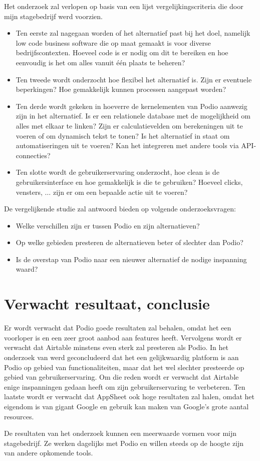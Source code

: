 Het onderzoek zal verlopen op basis van een lijst vergelijkingscriteria die door mijn stagebedrijf werd voorzien. 

\begin{itemize}
    \item Ten eerste zal nagegaan worden of het alternatief past bij het doel, namelijk low code business software die op maat gemaakt is voor diverse bedrijfscontexten. Hoeveel code is er nodig om dit te bereiken en hoe eenvoudig is het om alles vanuit één plaats te beheren?
    \item Ten tweede wordt onderzocht hoe flexibel het alternatief is. Zijn er eventuele beperkingen? Hoe gemakkelijk kunnen processen aangepast worden?
    \item Ten derde wordt gekeken in hoeverre de kernelementen van Podio aanwezig zijn in het alternatief. Is er een relationele database met de mogelijkheid om alles met elkaar te linken?  Zijn er calculatievelden om berekeningen uit te voeren of om dynamisch tekst te tonen? Is het alternatief in staat om automatiseringen uit te voeren? Kan het integreren met andere tools via API-connecties?
    \item Ten slotte wordt de gebruikerservaring onderzocht, hoe clean is de gebruikersinterface en hoe gemakkelijk is die te gebruiken? Hoeveel clicks, vensters, $\ldots$ zijn er om een bepaalde actie uit te voeren?
\end{itemize}

De vergelijkende studie zal antwoord bieden op volgende onderzoeksvragen:

\begin{itemize}
    \item Welke verschillen zijn er tussen Podio en zijn alternatieven?
    \item Op welke gebieden presteren de alternatieven beter of slechter dan Podio?
    \item Is de overstap van Podio naar een nieuwer alternatief de nodige inspanning waard?
\end{itemize}

\section{Verwacht resultaat, conclusie}%
\label{sec:verwachte_resultaten}

Er wordt verwacht dat Podio goede resultaten zal behalen, omdat het een voorloper is en een zeer groot aanbod aan features heeft. Vervolgens wordt er verwacht dat Airtable minstens even sterk zal presteren als Podio. In het onderzoek van \textcite{Spitaels2022} werd geconcludeerd dat het een gelijkwaardig platform is aan Podio op gebied van functionaliteiten, maar dat het wel slechter presteerde op gebied van gebruikerservaring. Om die reden wordt er verwacht dat Airtable enige inspanningen gedaan heeft om zijn gebruikerservaring te verbeteren. Ten laatste wordt er verwacht dat AppSheet ook hoge resultaten zal halen, omdat het eigendom is van gigant Google en gebruik kan maken van Google's grote aantal resources.

De resultaten van het onderzoek kunnen een meerwaarde vormen voor mijn stagebedrijf. Ze werken dagelijks met Podio en willen steeds op de hoogte zijn van andere opkomende tools.


